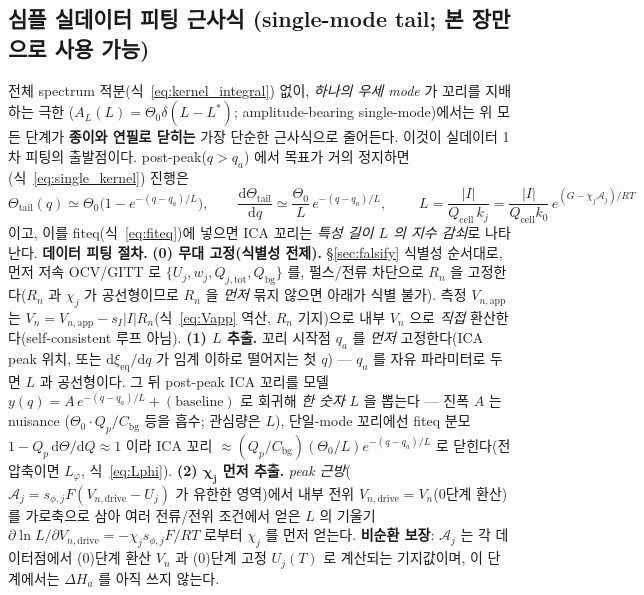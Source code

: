 \documentclass[11pt,a4paper]{article}
\newcommand{\dd}{\mathrm{d}}
\newcommand{\eq}{\mathrm{eq}}
\newcommand{\app}{\mathrm{app}}
\newcommand{\drive}{\mathrm{drive}}
\newcommand{\bg}{\mathrm{bg}}
\newcommand{\cell}{\mathrm{cell}}
\newcommand{\tot}{\mathrm{tot}}
\begin{document}
\subsection{심플 실데이터 피팅 근사식 (single-mode tail; 본 장만으로 사용 가능)}\label{sec:ch1_simplefit}
전체 spectrum 적분(식~\eqref{eq:kernel_integral}) 없이, \emph{하나의 우세 mode} 가 꼬리를 지배하는 극한
($A_L(L)=\Theta_0\delta(L-L^\ast)$; amplitude-bearing single-mode)에서는 위 모든 단계가 \textbf{종이와 연필로 닫히는} 가장 단순한 근사식으로 줄어든다. 이것이
실데이터 1차 피팅의 출발점이다. post-peak($q>q_a$) 에서 목표가 거의 정지하면(식~\eqref{eq:single_kernel}) 진행은
\begin{equation}
\Theta_\mathrm{tail}(q)\simeq\Theta_0\Big(1-e^{-(q-q_a)/L}\Big),\qquad
\frac{\dd\Theta_\mathrm{tail}}{\dd q}\simeq\frac{\Theta_0}{L}\,e^{-(q-q_a)/L},\qquad
\boxed{\;L=\frac{|I|}{Q_\cell\,k_j}=\frac{|I|}{Q_\cell k_0}\,e^{(G-\chi_j\mathcal A_j)/RT}\;}
\label{eq:simplefit}
\end{equation}
이고, 이를 fiteq(식~\eqref{eq:fiteq})에 넣으면 ICA 꼬리는 \emph{특성 길이 $L$ 의 지수 감쇠}로 나타난다.
\textbf{데이터 피팅 절차.}
\textbf{(0) 무대 고정(식별성 전제).} \S\ref{sec:falsify} 식별성 순서대로, 먼저 저속 OCV/GITT 로
$\{U_j,w_j,Q_{j,\tot},Q_\bg\}$ 를, 펄스/전류 차단으로 $R_n$ 을 고정한다($R_n$ 과 $\chi_j$ 가 공선형이므로 $R_n$ 을
\emph{먼저} 묶지 않으면 아래가 식별 불가). 측정 $V_{n,\app}$ 는 $V_n=V_{n,\app}-s_I|I|R_n$(식~\eqref{eq:Vapp} 역산,
$R_n$ 기지)으로 내부 $V_n$ 으로 \emph{직접} 환산한다(self-consistent 루프 아님).
\textbf{(1) $L$ 추출.} 꼬리 시작점 $q_a$ 를 \emph{먼저} 고정한다(ICA peak 위치, 또는 $\dd\xi_{\eq}/\dd q$ 가 임계
이하로 떨어지는 첫 $q$) — $q_a$ 를 자유 파라미터로 두면 $L$ 과 공선형이다. 그 뒤 post-peak ICA 꼬리를
모델 $y(q)=A\,e^{-(q-q_a)/L}+(\text{baseline})$ 로 회귀해 \emph{한 숫자} $L$ 을 뽑는다 — 진폭 $A$ 는 nuisance
($\Theta_0\cdot Q_p/C_\bg$ 등을 흡수; 관심량은 $L$), 단일-mode 꼬리에선 fiteq 분모 $1-Q_p\,\dd\Theta/\dd Q\!\approx\!1$
이라 ICA 꼬리 $\approx(Q_p/C_\bg)(\Theta_0/L)e^{-(q-q_a)/L}$ 로 닫힌다(전압축이면 $L_\varphi$, 식~\eqref{eq:Lphi}).
\textbf{(2) $\boldsymbol{\chi_j}$ 먼저 추출.} \emph{peak 근방}($\mathcal A_j=s_{\phi,j}F(V_{n,\drive}-U_j)$ 가 유한한 영역)에서 내부 전위
$V_{n,\drive}=V_n$(0단계 환산)를 가로축으로 삼아 여러 전류/전위 조건에서 얻은 $L$ 의 기울기
$\partial\ln L/\partial V_{n,\drive}=-\chi_j s_{\phi,j}F/RT$ 로부터 $\chi_j$ 를 먼저 얻는다. \textbf{비순환 보장}: $\mathcal A_j$ 는
각 데이터점에서 (0)단계 환산 $V_n$ 과 (0)단계 고정 $U_j(T)$ 로 계산되는 기지값이며, 이 단계에서는 $\Delta H_a$ 를 아직 쓰지 않는다.
\end{document}
